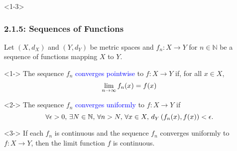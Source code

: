\documentclass[10pt,english,aspectratio=169]{beamer}
\begin{document}
\begin{frame}<1-3>
\frametitle{2.1.5: Sequences of Functions}

Let $(X,d_X)$ and $(Y,d_Y)$ be metric spaces and
$f_n \colon X \to Y$ for $n\in \mathbb{N}$ be a sequence of functions mapping $X$ to $Y$.

\begin{definition}<1->
The sequence $f_n$ \textcolor{blue}{converges pointwise} to $f\colon X \to Y$ if, for all $x \in X$, \vspace{-1.5mm}
\[ \lim_{n\to \infty} f_n (x) = f(x) \vspace*{-0.5mm} \]

\end{definition}

\begin{definition}<2->
The sequence $f_n$ \textcolor{blue}{converges uniformly} to $f \colon X \to Y$ if \vspace{-1.5mm}
\[ \forall \epsilon > 0, \, \exists N\in \mathbb{N}, \, \forall n>N, \, \forall x\in X, \, d_Y \left( f_n(x),f(x) \right) < \epsilon. \vspace*{-0.5mm} \]
\end{definition}

\begin{theorem}<3->
If each $f_n$ is continuous and the sequence $f_n$ converges uniformly to $f \colon X \to Y$, then the limit function $f$ is continuous.
\end{theorem}


\end{frame}
\end{document}
